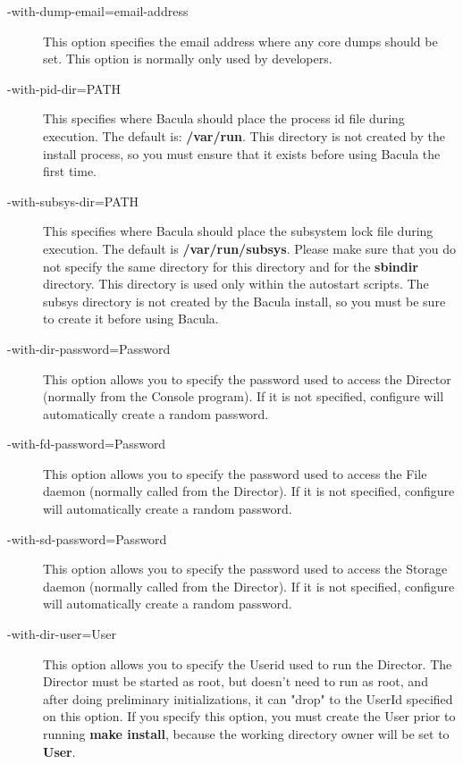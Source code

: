 \begin{description}
\item [ {-}{\-}with-dump-email=\lt{}email-address\gt{}]
   This option specifies  the email address where any core dumps should be set.
   This option  is normally only used by developers.  

\item [ {-}{\-}with-pid-dir=\lt{}PATH\gt{}  ]
   This specifies where Bacula should place the process id  file during
   execution. The default is: {\bf /var/run}.  This directory is not created by
   the install process, so  you must ensure that it exists before using Bacula
   the  first time.  

\item [ {-}{\-}with-subsys-dir=\lt{}PATH\gt{}]
   This specifies where Bacula should place the subsystem lock  file during
   execution. The default is {\bf /var/run/subsys}.  Please make sure that you do
   not specify the same directory  for this directory and for the {\bf sbindir}
   directory.  This directory is used only within the autostart scripts.  The
   subsys directory is not created by the Bacula install,  so you must be sure to
   create it before using Bacula. 

\item [ {-}{\-}with-dir-password=\lt{}Password\gt{}]
   This option allows you to specify the password used to  access the Director
   (normally from the Console program).  If it is not specified, configure will
   automatically create a random  password.  

\item [ {-}{\-}with-fd-password=\lt{}Password\gt{} ]
   This option allows you to specify the password used to  access the File daemon
   (normally called from the Director).  If it is not specified, configure will
   automatically create a random  password.  

\item [ {-}{\-}with-sd-password=\lt{}Password\gt{} ]
   This option allows you to specify the password used to access the Storage daemon
   (normally called from the Director).  If it is not specified, configure will
   automatically create a random  password.  

\item [ {-}{\-}with-dir-user=\lt{}User\gt{} ]
   This option allows you to specify the Userid used to run the Director.  The
   Director must be started as root, but doesn't need to run as root, and
   after doing preliminary initializations, it can "drop" to the UserId
   specified on this option.  
   If you specify this option, you must
   create the User prior to running {\bf make install}, because the
   working directory owner will be set to {\bf User}.
                       

\end{description}
